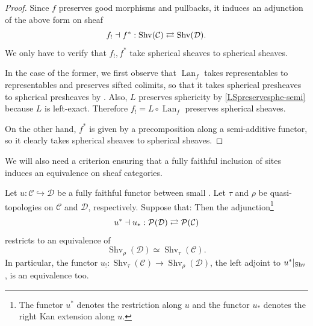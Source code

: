 \documentclass[a4paper,10pt, oneside]{amsart}
\begin{document}
	\begin{proof}
		Since $f$ preserves good morphisms and pullbacks, it induces an adjunction of the above form on sheaf \infcats
		$$f_! \dashv f^* : \operatorname{Shv}(\mathcal{C}) \rightleftarrows \operatorname{Shv}(\mathcal{D}).$$ We only have to verify that $f_!, f^*$ take spherical sheaves to spherical sheaves.
		
		In the case of the former, we first observe that $\operatorname{Lan}_f$ takes representables to representables and preserves sifted colimits, so that it takes spherical presheaves to spherical presheaves by \cite[Proposition 5.5.8.14]{htt}. Also, $L$  preserves sphericity by \cref{LSpreservesphe-semi} because $L$ is left-exact. Therefore $f_!= L \circ \operatorname{Lan}_f$ preserves spherical sheaves.
		
		On the other hand, $f^*$ is given by a precomposition along a  semi-additive functor, so it clearly takes spherical sheaves to spherical sheaves.
	\end{proof}
	We will also need a criterion ensuring that a fully faithful inclusion of sites induces an equivalence on sheaf categories.
	\begin{lem}\label{basisequi}
		Let $u: \mathcal{C} \hookrightarrow \mathcal{D}$ be a fully faithful functor between small \infcats. Let $\tau$ and $\rho$ be quasi-topologies on $\mathcal{C}$ and $\mathcal{D}$, respectively. Suppose that:
		Then the adjunction\footnote{The functor $u^*$ denotes the restriction along $u$ and the functor $u_*$ denotes the right Kan extension along $u$.} $$u^* \dashv u_* : \mathcal{P}(\mathcal{D}) \rightleftarrows \mathcal{P}(\mathcal{C})$$ restricts to an equivalence of \infcats $$\operatorname{Shv}_\rho(\mathcal{D}) \simeq \operatorname{Shv}_\tau(\mathcal{C}).$$ In particular, the functor $u_!:\operatorname{Shv}_\tau(\mathcal{C})\to \operatorname{Shv}_\rho(\mathcal{D})$, the left adjoint to $u^*|_{\operatorname{Shv}}$, is an equivalence too.
	\end{lem}
\end{document}
